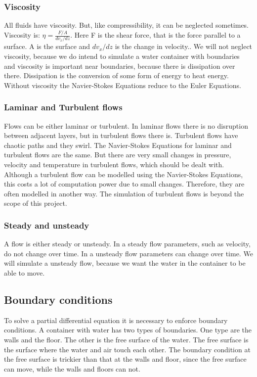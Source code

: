 \documentclass{article}
\begin{document}
\subsubsection{Viscosity}
All fluids have viscosity. But, like compressibility, it can be neglected sometimes. Viscosity is: \(\eta=\frac{F/A}{dv_{x}/dz }\). Here F is the shear force, that is the force parallel to a surface. A is the surface and \(dv_{x}/dz\) is the change in velocity.\cite{Viscosity}. We will not neglect viscosity, because we do intend to simulate a water container with boundaries and viscosity is important near boundaries, because there is dissipation over there.\cite{NSE features} Dissipation is the conversion of some form of energy to heat energy\cite{Dissipation}. Without viscosity the Navier-Stokes Equations reduce to the Euler Equations\cite{NSE features}.
\subsubsection{Laminar and Turbulent flows}
Flows can be either laminar or turbulent\cite{NSE features}. In laminar flows there is no disruption between adjacent layers, but in turbulent flows there is. Turbulent flows have chaotic paths and they swirl. The Navier-Stokes Equations for laminar and turbulent flows are the same. But there are very small changes in pressure, velocity and temperature in turbulent flows, which should be dealt with. Although a turbulent flow can be modelled using the Navier-Stokes Equations, this costs a lot of computation power due to small changes.\cite{Turbulence} Therefore, they are often modelled in another way. The simulation of turbulent flows is beyond the scope of this project.
\subsubsection{Steady and unsteady} \label{(un)steady}
A flow is either steady or unsteady\cite{NSE features}. In a steady flow parameters, such as velocity, do not change over time. In a unsteady flow parameters can change over time.\cite{Steady and unsteady} We will simulate a unsteady flow, because we want the water in the container to be able to move.
\subsection{Boundary conditions}
To solve a partial differential equation it is necessary to enforce boundary conditions. A container with water has two types of boundaries. One type are the walls and the floor. The other is the free surface of the water. The free surface is the surface where the water and air touch each other. The boundary condition at the free surface is trickier than that at the walls and floor, since the free surface can move, while the walls and floors can not. 
\end{document}
